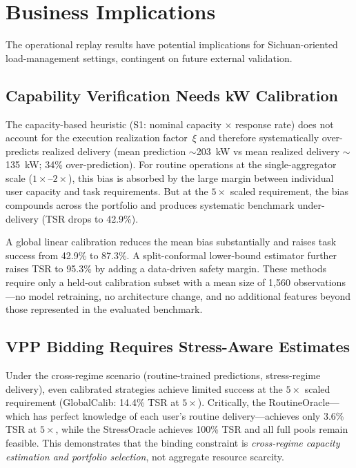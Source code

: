 \documentclass[utf8]{FrontiersinHarvard}
\begin{document}
\section{Business Implications}
\label{sec:implications}

The operational replay results have potential implications for
Sichuan-oriented load-management settings, contingent on future
external validation.

\subsection{Capability Verification Needs kW Calibration}

The capacity-based heuristic (S1: nominal capacity $\times$
response rate) does not account for the execution realization
factor~$\xi$ and therefore systematically over-predicts
realized delivery (mean prediction $\sim$203~kW vs mean realized
delivery $\sim$135~kW; 34\% over-prediction). For routine
operations at the single-aggregator scale ($1\times$--$2\times$),
this bias is absorbed by the large margin between individual user
capacity and task requirements. But at the $5\times$ scaled
requirement, the bias compounds across the portfolio
and produces systematic benchmark under-delivery (TSR drops to 42.9\%).

A global linear calibration reduces the mean bias substantially
and raises task success from 42.9\% to 87.3\%. A split-conformal
lower-bound estimator further raises TSR to 95.3\% by adding
a data-driven safety margin. These methods require only
a held-out calibration subset with a mean size of 1{,}560
observations---no model retraining, no
architecture change, and no additional features beyond those
represented in the evaluated benchmark.

\subsection{VPP Bidding Requires Stress-Aware Estimates}

Under the cross-regime scenario (routine-trained predictions,
stress-regime delivery), even calibrated strategies achieve
limited success at the $5\times$ scaled requirement
(GlobalCalib: 14.4\% TSR at $5\times$). Critically, the RoutineOracle---which
has perfect knowledge of each user's routine delivery---achieves
only 3.6\% TSR at $5\times$, while the StressOracle achieves 100\% TSR
and all full pools remain feasible. This demonstrates that the
binding constraint is \emph{cross-regime capacity estimation
and portfolio selection}, not aggregate resource scarcity.
\end{document}
